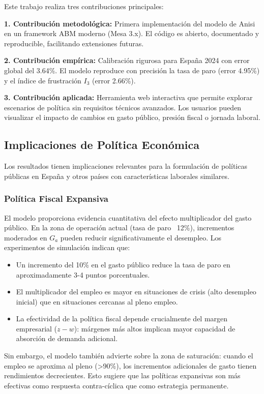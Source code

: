 Este trabajo realiza tres contribuciones principales:

\textbf{1. Contribución metodológica:} Primera implementación del modelo de Anisi en un framework ABM moderno (Mesa 3.x). El código es abierto, documentado y reproducible, facilitando extensiones futuras.

\textbf{2. Contribución empírica:} Calibración rigurosa para España 2024 con error global del 3.64\%. El modelo reproduce con precisión la tasa de paro (error 4.95\%) y el índice de frustración $I_3$ (error 2.66\%).

\textbf{3. Contribución aplicada:} Herramienta web interactiva que permite explorar escenarios de política sin requisitos técnicos avanzados. Los usuarios pueden visualizar el impacto de cambios en gasto público, presión fiscal o jornada laboral.

\subsection{Implicaciones de Política Económica}

Los resultados tienen implicaciones relevantes para la formulación de políticas públicas en España y otros países con características laborales similares.

\subsubsection{Política Fiscal Expansiva}

El modelo proporciona evidencia cuantitativa del efecto multiplicador del gasto público. En la zona de operación actual (tasa de paro ~12\%), incrementos moderados en $G_a$ pueden reducir significativamente el desempleo. Los experimentos de simulación indican que:

\begin{itemize}
    \item Un incremento del 10\% en el gasto público reduce la tasa de paro en aproximadamente 3-4 puntos porcentuales.
    \item El multiplicador del empleo es mayor en situaciones de crisis (alto desempleo inicial) que en situaciones cercanas al pleno empleo.
    \item La efectividad de la política fiscal depende crucialmente del margen empresarial ($z - w$): márgenes más altos implican mayor capacidad de absorción de demanda adicional.
\end{itemize}

Sin embargo, el modelo también advierte sobre la zona de saturación: cuando el empleo se aproxima al pleno (>90\%), los incrementos adicionales de gasto tienen rendimientos decrecientes. Esto sugiere que las políticas expansivas son más efectivas como respuesta contra-cíclica que como estrategia permanente.

